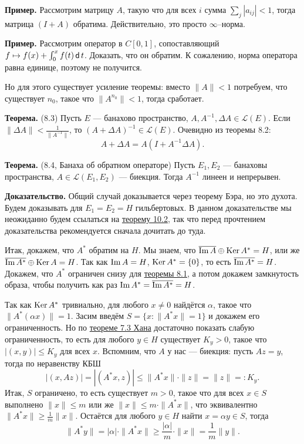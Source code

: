 \QED

\textbf{Пример.} Рассмотрим матрицу $A$, такую что для всех $i$ сумма $\sum_j |a_{ij}| < 1$, тогда матрица $(I + A)$ обратима.
Действительно, это просто $\infty$--норма.

\textbf{Пример.} Рассмотрим оператор в $C[0, 1]$, сопоставляющий $f \mapsto f(x) + \int_0^x f(t) \operatorname{\mathsf d} t$.
Доказать, что он обратим.
К сожалению, норма оператора равна единице, поэтому не получится.

Но для этого существует усиление теоремы: вместо $\|A\| < 1$ потребуем, что существует $n_0$, такое что $\|A^{n_0}\| < 1$, тогда сработает.

\label{th:8-3} \textbf{Теорема.} (8.3) Пусть $E$ --- банахово пространство, $A, A^{-1}, \Delta A \in \mathcal L(E)$.
Если $\|\Delta A\| < \frac{1}{\|A^{-1}\|}$, то $(A + \Delta A)^{-1} \in \mathcal L(E)$.
Очевидно из теоремы 8.2:
\[
    A + \Delta A = A (I + A^{-1} \Delta A).
\]

\label{th:8-4} \textbf{Теорема.} (8.4, Банаха об обратном операторе) Пусть $E_1, E_2$ --- банаховы пространства, $A \in \mathcal L(E_1, E_2)$ --- биекция.
Тогда $A^{-1}$ линеен и непрерывен.

\textbf{Доказательство.} Общий случай доказывается через теорему Бэра, но это духота.
Будем доказывать для $E_1 = E_2 = H$ гильбертовых.
В данном доказательстве мы неожиданно будем ссылаться на \hyperref[th:10-2]{теорему 10.2}, так что перед прочтением доказательства рекомендуется сначала дочитать до туда.

Итак, докажем, что $A^*$ обратим на $H$.
Мы знаем, что $\overline{\operatorname{Im} A} \oplus \operatorname{Ker} A^* = H$, или же $\overline{\operatorname{Im} A^*} \oplus \operatorname{Ker} A = H$.
Так как $\operatorname{Im} A = H$, $\operatorname{Ker} A^* = \{0\}$, то есть $\overline{\operatorname{Im} A^*} = H$.
Докажем, что $A^*$ ограничен снизу для \hyperref[th:8-1]{теоремы 8.1}, а потом докажем замкнутость образа, чтобы получить как раз $\operatorname{Im} A^* = \overline{\operatorname{Im} A^*} = H$.

Так как $\operatorname{Ker} A^*$ тривиально, для любого $x \ne 0$ найдётся $\alpha$, такое что $\|A^*(\alpha x)\| = 1$.
Засим введём $S = \{x: \|A^* x\| = 1\}$ и докажем его ограниченность.
Но по \hyperref[th:7-3]{теореме 7.3 Хана} достаточно показать слабую ограниченность, то есть для любого $y \in H$ существует $K_y > 0$, такое что $|(x, y)| \le K_y$ для всех $x$.
Вспомним, что $A$ у нас --- биекция: пусть $Az = y$, тогда по неравенству КБШ
\[
    |(x, Az)| = |(A^* x, z)| \le \|A^* x\| \cdot \|z\| = \|z\| =: K_y.
\]
Итак, $S$ ограничено, то есть существует $m > 0$, такое что для всех $x \in S$ выполнено $\|x\| \le m$ или же $\|x\| \le m \cdot \|A^* x\|$, что эквивалентно $\|A^* x\| \ge \frac{1}{m} \|x\|$.
Остаётся для любого $y \in H$ найти $x = \alpha y \in S$, тогда
\[
    \|A^* y\| = |\alpha| \cdot \|A^* x\| \ge \frac{|\alpha|}{m} \cdot \|x\| = \frac{1}{m} \|y\|.
\]


